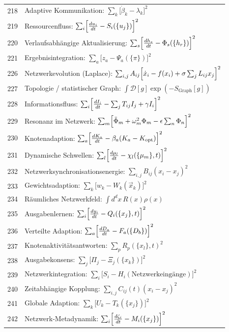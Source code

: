 \documentclass[11pt,a4paper]{article}
\begin{document}
\begin{longtable}{r l}
		218 & Adaptive Kommunikation: $\sum_k\bigl[\dot\beta_k - \lambda_k\bigr]^2$ \\
		219 & Ressourcenfluss: $\sum_i\Bigl[\frac{du_i}{dt} - S_i(\{u_j\})\Bigr]^2$ \\
		220 & Verlaufsabhängige Aktualisierung: $\sum_s\Bigl[\frac{dh_s}{dt} - \Phi_s(\{h_r\})\Bigr]^2$ \\
		221 & Ergebnisintegration: $\sum_a\bigl[z_a - \Psi_a(\{\pi\})\bigr]^2$ \\
		226 & Netzwerkevolution (Laplace): $\sum_{i,j}A_{ij}\Bigl[\dot x_i - f(x_i) + \sigma\sum_j L_{ij}x_j\Bigr]^2$ \\
		227 & Topologie / statistischer Graph: $\int\mathcal{D}[g]\exp(-S_{\text{Graph}}[g])$ \\
		228 & Informationsfluss: $\sum_i\Bigl[\frac{dI_i}{dt} - \sum_j T_{ij}I_j + \gamma I_i\Bigr]^2$ \\
		229 & Resonanz im Netzwerk: $\sum_m\Bigl[\ddot\Phi_m + \omega_m^2\Phi_m - \epsilon\sum_n\Phi_n\Bigr]^2$ \\
		230 & Knotenadaption: $\sum_a\Bigl[\frac{dK_a}{dt} - \beta_a(K_a - K_{\text{opt}})\Bigr]^2$ \\
		231 & Dynamische Schwellen: $\sum_l\Bigl[\frac{d\mu_l}{dt} - \chi_l(\{\mu_m\},t)\Bigr]^2$ \\
		232 & Netzwerksynchronisationsenergie: $\sum_{i,j}B_{ij}(x_i - x_j)^2$ \\
		233 & Gewichtsadaption: $\sum_k\bigl[w_k - W_k(\vec x_k)\bigr]^2$ \\
		234 & Räumliches Netzwerkfeld: $\int d^dx\,R(x)\rho(x)$ \\
		235 & Ausgabenlernen: $\sum_i\Bigl[\frac{dy_i}{dt} - Q_i(\{x_j\},t)\Bigr]^2$ \\
		236 & Verteilte Adaption: $\sum_a\Bigl[\frac{dD_a}{dt} - F_a(\{D_b\})\Bigr]^2$ \\
		237 & Knotenaktivitätsantworten: $\sum_p R_p(\{x_l\},t)^2$ \\
		238 & Ausgabekonsens: $\sum_j\bigl[\Pi_j - \Xi_j(\{x_k\})\bigr]^2$ \\
		239 & Netzwerkintegration: $\sum_i\bigl[S_i - H_i(\text{Netzwerkeingänge})\bigr]^2$ \\
		240 & Zeitabhängige Kopplung: $\sum_{i,j}C_{ij}(t)(x_i - x_j)^2$ \\
		241 & Globale Adaption: $\sum_k\bigl[U_k - T_k(\{x_j\})\Bigr]^2$ \\
		242 & Netzwerk-Metadynamik: $\sum_i\Bigl[\frac{d\zeta_i}{dt} - M_i(\{x_j\})\Bigr]^2$ \\

\end{longtable}
\end{document}
